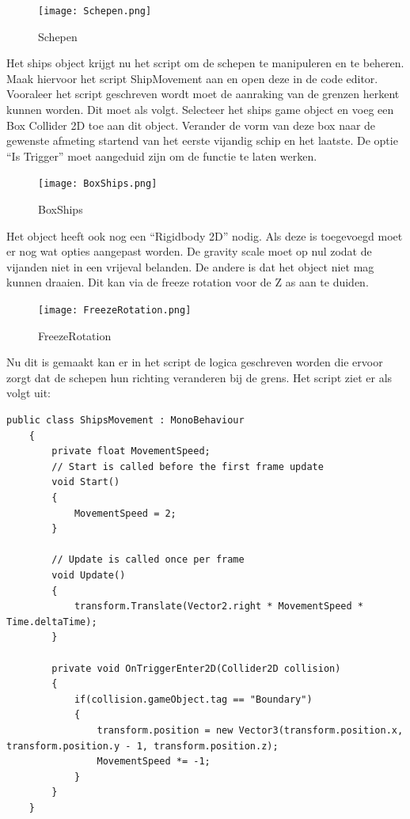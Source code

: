 \begin{figure}[H]
    \centering
    \texttt{[image: Schepen.png]}
    \caption{Schepen}
    \label{fig:Schepen}
\end{figure}

Het ships object krijgt nu het script om de schepen te manipuleren en te beheren. Maak hiervoor het script ShipMovement aan en open deze in de code editor. Vooraleer het script geschreven wordt moet de aanraking van de grenzen herkent kunnen worden. Dit moet als volgt. Selecteer het ships game object en voeg een Box Collider 2D toe aan dit object. Verander de vorm van deze box naar de gewenste afmeting startend van het eerste vijandig schip en het laatste. De optie “Is Trigger” moet aangeduid zijn om de functie te laten werken.

\begin{figure}[H]
    \centering
    \texttt{[image: BoxShips.png]}
    \caption{BoxShips}
    \label{fig:BoxShips}
\end{figure}

Het object heeft ook nog een “Rigidbody 2D” nodig. Als deze is toegevoegd moet er nog wat opties aangepast worden. De gravity scale moet op nul zodat de vijanden niet in een vrijeval belanden. De andere is dat het object niet mag kunnen draaien. Dit kan via de freeze rotation voor de Z as aan te duiden. 

\begin{figure}[H]
    \centering
    \texttt{[image: FreezeRotation.png]}
    \caption{FreezeRotation}
    \label{fig:FreezeRotation}
\end{figure}

Nu dit is gemaakt kan er in het script de logica geschreven worden die ervoor zorgt dat de schepen hun richting veranderen bij de grens. Het script ziet er als volgt uit:

\begin{lstlisting}[style=csharp]
    public class ShipsMovement : MonoBehaviour
    {
        private float MovementSpeed;
        // Start is called before the first frame update
        void Start()
        {
            MovementSpeed = 2;
        }
        
        // Update is called once per frame
        void Update()
        {
            transform.Translate(Vector2.right * MovementSpeed * Time.deltaTime);
        }
        
        private void OnTriggerEnter2D(Collider2D collision)
        {
            if(collision.gameObject.tag == "Boundary")
            {
                transform.position = new Vector3(transform.position.x, transform.position.y - 1, transform.position.z);
                MovementSpeed *= -1;
            }
        }
    }
\end{lstlisting}

